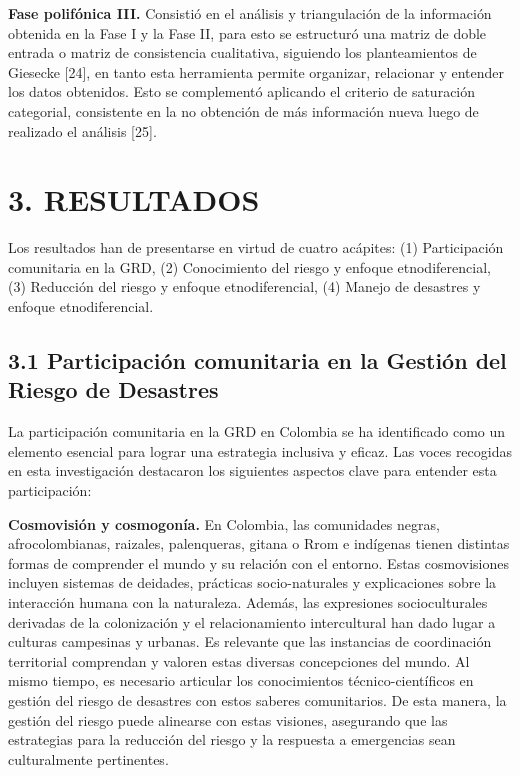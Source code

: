 \documentclass[
  spanish,
  letterpaper,
]{book}
\begin{document}
\textbf{Fase polifónica III.} Consistió en el análisis y triangulación
de la información obtenida en la Fase I y la Fase II, para esto se
estructuró una matriz de doble entrada o matriz de consistencia
cualitativa, siguiendo los planteamientos de Giesecke {[}24{]}, en tanto
esta herramienta permite organizar, relacionar y entender los datos
obtenidos. Esto se complementó aplicando el criterio de saturación
categorial, consistente en la no obtención de más información nueva
luego de realizado el análisis {[}25{]}.


\chapter{3. RESULTADOS}\label{resultados-1}

Los resultados han de presentarse en virtud de cuatro acápites: (1)
Participación comunitaria en la GRD, (2) Conocimiento del riesgo y
enfoque etnodiferencial, (3) Reducción del riesgo y enfoque
etnodiferencial, (4) Manejo de desastres y enfoque etnodiferencial.

\section{3.1 Participación comunitaria en la Gestión del Riesgo de
Desastres}\label{participaciuxf3n-comunitaria-en-la-gestiuxf3n-del-riesgo-de-desastres}

La participación comunitaria en la GRD en Colombia se ha identificado
como un elemento esencial para lograr una estrategia inclusiva y eficaz.
Las voces recogidas en esta investigación destacaron los siguientes
aspectos clave para entender esta participación:

\textbf{Cosmovisión y cosmogonía.} En Colombia, las comunidades negras,
afrocolombianas, raizales, palenqueras, gitana o Rrom e indígenas tienen
distintas formas de comprender el mundo y su relación con el entorno.
Estas cosmovisiones incluyen sistemas de deidades, prácticas
socio-naturales y explicaciones sobre la interacción humana con la
naturaleza. Además, las expresiones socioculturales derivadas de la
colonización y el relacionamiento intercultural han dado lugar a
culturas campesinas y urbanas. Es relevante que las instancias de
coordinación territorial comprendan y valoren estas diversas
concepciones del mundo. Al mismo tiempo, es necesario articular los
conocimientos técnico-científicos en gestión del riesgo de desastres con
estos saberes comunitarios. De esta manera, la gestión del riesgo puede
alinearse con estas visiones, asegurando que las estrategias para la
reducción del riesgo y la respuesta a emergencias sean culturalmente
pertinentes.
\end{document}
